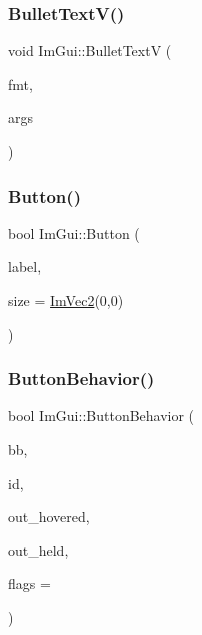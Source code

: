 \mbox{\label{namespace_im_gui_af8f4b5e96c745e205974857f9a584583}} 
\subsubsection{\texorpdfstring{Bullet\+Text\+V()}{BulletTextV()}}
{\footnotesize\ttfamily void Im\+Gui\+::\+Bullet\+TextV (\begin{DoxyParamCaption}\item[{const char $\ast$}]{fmt,  }\item[{va\+\_\+list}]{args }\end{DoxyParamCaption})}

\mbox{\label{namespace_im_gui_a38094c568ce398db5a3abb9d3ac92030}} 
\subsubsection{\texorpdfstring{Button()}{Button()}}
{\footnotesize\ttfamily bool Im\+Gui\+::\+Button (\begin{DoxyParamCaption}\item[{const char $\ast$}]{label,  }\item[{const \mbox{\hyperlink{struct_im_vec2}{Im\+Vec2}} \&}]{size = {\ttfamily \mbox{\hyperlink{struct_im_vec2}{Im\+Vec2}}(0,0)} }\end{DoxyParamCaption})}

\mbox{\label{namespace_im_gui_a65a4f18b1bc8ce0f351687922089f374}} 
\subsubsection{\texorpdfstring{Button\+Behavior()}{ButtonBehavior()}}
{\footnotesize\ttfamily bool Im\+Gui\+::\+Button\+Behavior (\begin{DoxyParamCaption}\item[{const \mbox{\hyperlink{struct_im_rect}{Im\+Rect}} \&}]{bb,  }\item[{\mbox{\hyperlink{imgui_8h_a1785c9b6f4e16406764a85f32582236f}{Im\+Gui\+ID}}}]{id,  }\item[{bool $\ast$}]{out\+\_\+hovered,  }\item[{bool $\ast$}]{out\+\_\+held,  }\item[{\mbox{\hyperlink{imgui__internal_8h_a990fae518aa1d95f571ee40989de4c22}{Im\+Gui\+Button\+Flags}}}]{flags = {} }\end{DoxyParamCaption})}

